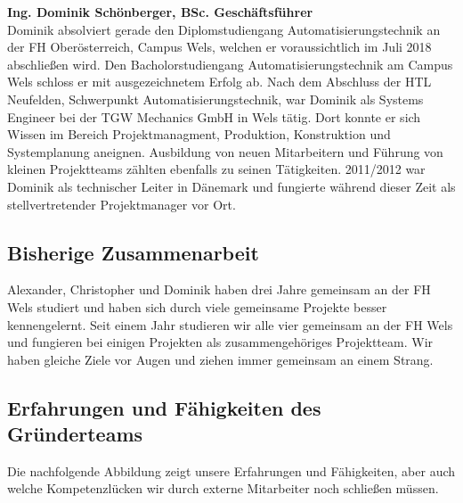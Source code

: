\textbf{Ing. Dominik Schönberger, BSc. Geschäftsführer} \\
Dominik absolviert gerade den Diplomstudiengang Automatisierungstechnik an der FH Oberösterreich, Campus Wels, welchen er voraussichtlich im Juli 2018 abschließen wird. Den Bacholorstudiengang Automatisierungstechnik am Campus Wels schloss er mit ausgezeichnetem Erfolg ab.  Nach dem Abschluss der HTL Neufelden, Schwerpunkt Automatisierungstechnik, war Dominik als Systems Engineer bei der TGW Mechanics GmbH in Wels tätig. Dort konnte er sich Wissen im Bereich Projektmanagment, Produktion, Konstruktion und Systemplanung aneignen. Ausbildung von neuen Mitarbeitern und Führung von kleinen Projektteams zählten ebenfalls zu seinen Tätigkeiten. 2011/2012 war Dominik als technischer Leiter in Dänemark und fungierte während dieser Zeit als stellvertretender Projektmanager vor Ort.\\

\subsection{Bisherige Zusammenarbeit}
Alexander, Christopher und Dominik haben drei Jahre gemeinsam an der FH Wels studiert und haben sich durch viele gemeinsame Projekte besser kennengelernt. Seit einem Jahr studieren wir alle vier gemeinsam an der FH Wels und fungieren bei einigen Projekten als zusammengehöriges Projektteam. Wir haben gleiche Ziele vor Augen und ziehen immer gemeinsam an einem Strang. 


\subsection{Erfahrungen und Fähigkeiten des Gründerteams}
Die nachfolgende Abbildung zeigt unsere Erfahrungen und Fähigkeiten, aber auch welche Kompetenzlücken wir durch externe Mitarbeiter noch schließen müssen. 

